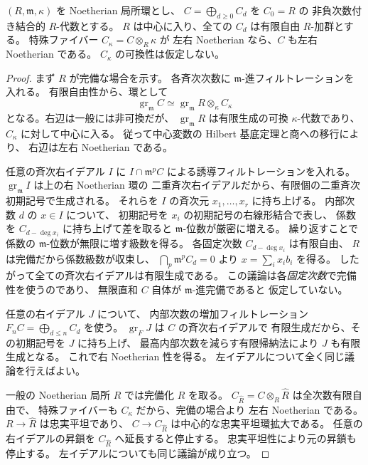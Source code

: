 \begin{lemma}
\label{lem:local-commutative-fibre-noetherian}
$(R,\mathfrak m,\kappa)$ を Noetherian 局所環とし、
$C=\bigoplus_{d\ge0}C_d$ を $C_0=R$ の
非負次数付き結合的 $R$-代数とする。
$R$ は中心に入り、全ての $C_d$ は有限自由 $R$-加群とする。
特殊ファイバー $C_\kappa=C\otimes_R\kappa$ が
左右 Noetherian なら、$C$ も左右 Noetherian である。
$C_\kappa$ の可換性は仮定しない。
\end{lemma}
\begin{proof}
まず $R$ が完備な場合を示す。
各斉次次数に $\mathfrak m$-進フィルトレーションを入れる。
有限自由性から、環として
\[
 \operatorname{gr}_{\mathfrak m} C
 \simeq \operatorname{gr}_{\mathfrak m}R
               \otimes_\kappa C_\kappa
 \tag{Complete-gr}\label{eq:complete-local-gr}
\]
となる。右辺は一般には非可換だが、
$\operatorname{gr}_{\mathfrak m}R$ は有限生成の可換
$\kappa$-代数であり、$C_\kappa$ に対して中心に入る。
従って中心変数の Hilbert 基底定理と商への移行により、
右辺は左右 Noetherian である。

任意の斉次右イデアル $I$ に
$I\cap\mathfrak m^pC$ による誘導フィルトレーションを入れる。
$\operatorname{gr}_{\mathfrak m}I$ は上の右 Noetherian 環の
二重斉次右イデアルだから、有限個の二重斉次初期記号で生成される。
それらを $I$ の斉次元 $x_1,\ldots,x_r$ に持ち上げる。
内部次数 $d$ の $x\in I$ について、
初期記号を $x_i$ の初期記号の右線形結合で表し、
係数を $C_{d-\deg x_i}$ に持ち上げて差を取ると
$\mathfrak m$-位数が厳密に増える。
繰り返すことで係数の $\mathfrak m$-位数が無限に増す級数を得る。
各固定次数 $C_{d-\deg x_i}$ は有限自由、
$R$ は完備だから係数級数が収束し、
$\bigcap_p\mathfrak m^pC_d=0$ より
$x=\sum_i x_i b_i$ を得る。
したがって全ての斉次右イデアルは有限生成である。
この議論は各\emph{固定次数}で完備性を使うのであり、
無限直和 $C$ 自体が $\mathfrak m$-進完備であると
仮定していない。

任意の右イデアル $J$ について、
内部次数の増加フィルトレーション
$F_nC=\bigoplus_{d\le n}C_d$ を使う。
$\operatorname{gr}_FJ$ は $C$ の斉次右イデアルで
有限生成だから、その初期記号を $J$ に持ち上げ、
最高内部次数を減らす有限帰納法により $J$ も有限生成となる。
これで右 Noetherian 性を得る。
左イデアルについて全く同じ議論を行えばよい。

一般の Noetherian 局所 $R$ では完備化 $\widehat R$ を取る。
$C_{\widehat R}=C\otimes_R\widehat R$ は全次数有限自由で、
特殊ファイバーも $C_\kappa$ だから、完備の場合より
左右 Noetherian である。
$R\to\widehat R$ は忠実平坦であり、
$C\to C_{\widehat R}$ は中心的な忠実平坦環拡大である。
任意の右イデアルの昇鎖を $C_{\widehat R}$ へ延長すると停止する。
忠実平坦性により元の昇鎖も停止する。
左イデアルについても同じ議論が成り立つ。
\end{proof}




